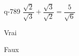 \begin{truefalse}{q-789}
$\dfrac{\sqrt{2}}{\sqrt{3}}+\dfrac{\sqrt{3}}{\sqrt{2}} = \dfrac{5}{\sqrt{6}}$
\item* Vrai
\item Faux
\end{truefalse}

